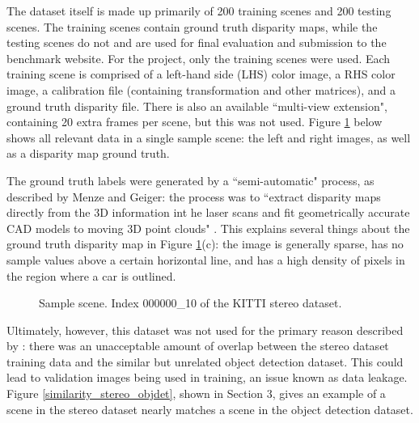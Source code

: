 The dataset itself is made up primarily of 200 training scenes and 200 testing scenes. The training scenes contain ground truth disparity maps, while the testing scenes do not and are used for final evaluation and submission to the benchmark website. For the project, only the training scenes were used. Each training scene is comprised of a left-hand side (LHS) color image, a RHS color image, a calibration file (containing transformation and other matrices), and a ground truth disparity file. There is also an available ``multi-view extension", containing 20 extra frames per scene, but this was not used. Figure \ref{stereo_sample} below shows all relevant data in a single sample scene: the left and right images, as well as a disparity map ground truth.

The ground truth labels were generated by a ``semi-automatic" process, as described by Menze and Geiger: the process was to ``extract disparity maps directly from the 3D information int he laser scans and fit geometrically accurate CAD models to moving 3D point clouds" \cite{menze_object_2015}. This explains several things about the ground truth disparity map in Figure \ref{stereo_sample}(c): the image is generally sparse, has no sample values above a certain horizontal line, and has a high density of pixels in the region where a car is outlined.

\begin{figure}[H]
    \centering
    \caption{Sample scene. Index 000000\_10 of the KITTI stereo dataset.}
    \label{stereo_sample}
\end{figure}



Ultimately, however, this dataset was not used for the primary reason described by \cite{wang_pseudo-lidar_2019}: there was an unacceptable amount of overlap between the stereo dataset training data and the similar but unrelated object detection dataset. This could lead to validation images being used in training, an issue known as data leakage. Figure \ref{similarity_stereo_objdet}, shown in Section 3, gives an example of a scene in the stereo dataset nearly matches a scene in the object detection dataset.

